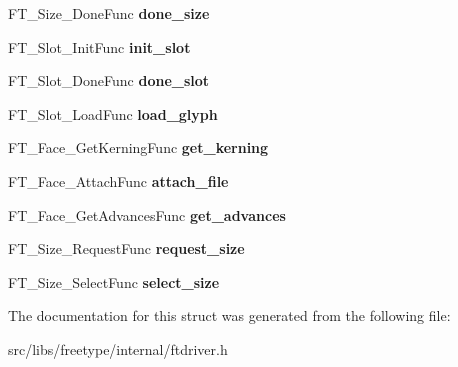 \begin{DoxyCompactItemize}
\item 
\hypertarget{struct_f_t___driver___class_rec___a5c96f627816a089b27bcff09f22dd1a6}{
FT\_\-Size\_\-DoneFunc {\bfseries done\_\-size}}
\label{struct_f_t___driver___class_rec___a5c96f627816a089b27bcff09f22dd1a6}

\item 
\hypertarget{struct_f_t___driver___class_rec___ae4e1d4ec7bdbdee0b4a5f8fc8f113d30}{
FT\_\-Slot\_\-InitFunc {\bfseries init\_\-slot}}
\label{struct_f_t___driver___class_rec___ae4e1d4ec7bdbdee0b4a5f8fc8f113d30}

\item 
\hypertarget{struct_f_t___driver___class_rec___a548a343f5921f5d341142bf3743c42d4}{
FT\_\-Slot\_\-DoneFunc {\bfseries done\_\-slot}}
\label{struct_f_t___driver___class_rec___a548a343f5921f5d341142bf3743c42d4}

\item 
\hypertarget{struct_f_t___driver___class_rec___a49dbd71e64094d4d825b8b8d51dd4e47}{
FT\_\-Slot\_\-LoadFunc {\bfseries load\_\-glyph}}
\label{struct_f_t___driver___class_rec___a49dbd71e64094d4d825b8b8d51dd4e47}

\item 
\hypertarget{struct_f_t___driver___class_rec___a398395bfdbef65a8d531724d200ed91c}{
FT\_\-Face\_\-GetKerningFunc {\bfseries get\_\-kerning}}
\label{struct_f_t___driver___class_rec___a398395bfdbef65a8d531724d200ed91c}

\item 
\hypertarget{struct_f_t___driver___class_rec___a9caec9ae56a4bab9c90cede699279f29}{
FT\_\-Face\_\-AttachFunc {\bfseries attach\_\-file}}
\label{struct_f_t___driver___class_rec___a9caec9ae56a4bab9c90cede699279f29}

\item 
\hypertarget{struct_f_t___driver___class_rec___aad560cd145b6d7cab7eae79194b1d724}{
FT\_\-Face\_\-GetAdvancesFunc {\bfseries get\_\-advances}}
\label{struct_f_t___driver___class_rec___aad560cd145b6d7cab7eae79194b1d724}

\item 
\hypertarget{struct_f_t___driver___class_rec___a03ff7c2e4a2fb6d08eb481b03a78e8de}{
FT\_\-Size\_\-RequestFunc {\bfseries request\_\-size}}
\label{struct_f_t___driver___class_rec___a03ff7c2e4a2fb6d08eb481b03a78e8de}

\item 
\hypertarget{struct_f_t___driver___class_rec___a1b365eb82525dae0a816974d949fe0dd}{
FT\_\-Size\_\-SelectFunc {\bfseries select\_\-size}}
\label{struct_f_t___driver___class_rec___a1b365eb82525dae0a816974d949fe0dd}

\end{DoxyCompactItemize}


The documentation for this struct was generated from the following file:\begin{DoxyCompactItemize}
\item 
src/libs/freetype/internal/ftdriver.h\end{DoxyCompactItemize}
